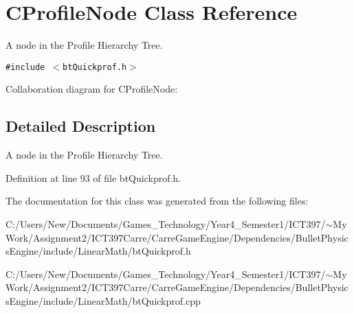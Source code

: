 \hypertarget{class_c_profile_node}{
\section{CProfileNode Class Reference}
\label{class_c_profile_node}
}
A node in the Profile Hierarchy Tree.  


{\tt \#include $<$btQuickprof.h$>$}

Collaboration diagram for CProfileNode:

\subsection{Detailed Description}
A node in the Profile Hierarchy Tree. 

Definition at line 93 of file btQuickprof.h.

The documentation for this class was generated from the following files:\begin{CompactItemize}
\item 
C:/Users/New/Documents/Games\_\-Technology/Year4\_\-Semester1/ICT397/$\sim$My Work/Assignment2/ICT397Carre/CarreGameEngine/Dependencies/BulletPhysicsEngine/include/LinearMath/btQuickprof.h\item 
C:/Users/New/Documents/Games\_\-Technology/Year4\_\-Semester1/ICT397/$\sim$My Work/Assignment2/ICT397Carre/CarreGameEngine/Dependencies/BulletPhysicsEngine/include/LinearMath/btQuickprof.cpp\end{CompactItemize}
